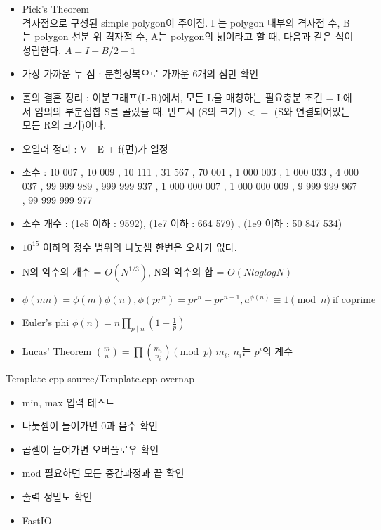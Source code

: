 \documentclass[landscape, 10pt, a4paper, oneside, twocolumn]{extarticle}
\begin{document}
\begin{itemize}
\item Pick’s Theorem\\
격자점으로 구성된 simple polygon이 주어짐. I 는 polygon 내부의 격자점 수, B 는 polygon 선분 위 격자점 수, A는 polygon의 넓이라고 할 때, 다음과 같은 식이 성립한다. $A=I+B/2-1$
\item 가장 가까운 두 점 : 분할정복으로 가까운 6개의 점만 확인
\item 홀의 결혼 정리 : 이분그래프(L-R)에서, 모든 L을 매칭하는 필요충분 조건 = L에서 임의의 부분집합 S를 골랐을 때, 반드시 (S의 크기) $<=$ (S와 연결되어있는 모든 R의 크기)이다.
\item 오일러 정리 : V - E + f(면)가 일정
\item 소수 : 10 007 , 10 009 , 10 111 , 31 567 , 70 001 , 1 000 003 , 1 000 033 , 4 000 037 , 99 999 989 , 999 999 937 , 1 000 000 007 , 1 000 000 009 , 9 999 999 967 , 99 999 999 977
\item 소수 개수 : (1e5 이하 : 9592), (1e7 이하 : 664 579) , (1e9 이하 : 50 847 534) 
\item $10^{15}$ 이하의 정수 범위의 나눗셈 한번은 오차가 없다.
\item N의 약수의 개수 = $O(N^{1/3})$, N의 약수의 합 = $O(NloglogN)$
\item $\phi(mn) = \phi(m) \phi(n) , \phi(pr^n) = pr^n - pr^{n-1} , a^{\phi(n)} \equiv 1 \pmod{n} \ \text{if coprime}$
\end{itemize}

\begin{itemize}  %
\item Euler's phi $\phi (n)=n\prod _{p\mid n}\left(1-{\frac {1}{p}}\right)$
\item Lucas' Theorem $\binom{m}{n}=\prod\binom{m_i}{n_i} \pmod p$ $m_i$, $n_i$는 $p^i$의 계수
\end{itemize}

\Algorithm
{Template}
{}
{}
{cpp}
{source/Template.cpp}
{overnap}


\begin{itemize}
\item min, max 입력 테스트
\item 나눗셈이 들어가면 0과 음수 확인
\item 곱셈이 들어가면 오버플로우 확인
\item mod 필요하면 모든 중간과정과 끝 확인
\item 출력 정밀도 확인
\item FastIO
\end{itemize}
\end{document}
